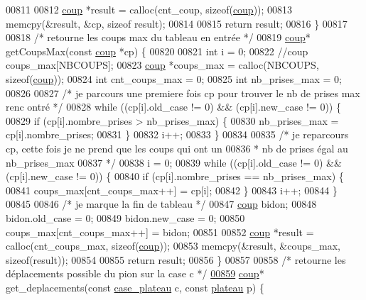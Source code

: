 \begin{DoxyCode}
00811 
00812         \hyperlink{structcoup}{coup} *result = calloc(cnt\_coup, \textcolor{keyword}{sizeof}(\hyperlink{structcoup}{coup}));
00813         memcpy(&result, &cp, \textcolor{keyword}{sizeof} result);
00814 
00815         \textcolor{keywordflow}{return} result;
00816 \}
00817 
00818 \textcolor{comment}{/* retourne les coups max du tableau en entrée */}
00819 \hyperlink{structcoup}{coup}* getCoupsMax(\textcolor{keyword}{const} \hyperlink{structcoup}{coup} *cp) \{
00820 
00821         \textcolor{keywordtype}{int} i = 0;
00822         \textcolor{comment}{//coup coups\_max[NBCOUPS];}
00823         \hyperlink{structcoup}{coup} *coups\_max = calloc(NBCOUPS, \textcolor{keyword}{sizeof}(\hyperlink{structcoup}{coup}));
00824         \textcolor{keywordtype}{int} cnt\_coups\_max = 0;
00825         \textcolor{keywordtype}{int} nb\_prises\_max = 0;
00826 
00827         \textcolor{comment}{/* je parcours une premiere fois cp pour trouver le nb de prises max renc
      ontré */}
00828         \textcolor{keywordflow}{while} ((cp[i].old\_case != 0) && (cp[i].new\_case != 0)) \{
00829                 \textcolor{keywordflow}{if} (cp[i].nombre\_prises > nb\_prises\_max) \{
00830                         nb\_prises\_max = cp[i].nombre\_prises;
00831                 \}
00832                 i++;
00833         \}
00834 
00835         \textcolor{comment}{/* je reparcours cp, cette fois je ne prend que les coups qui ont un}
00836 \textcolor{comment}{         * nb de prises égal au nb\_prises\_max}
00837 \textcolor{comment}{         */}
00838         i = 0;
00839         \textcolor{keywordflow}{while} ((cp[i].old\_case != 0) && (cp[i].new\_case != 0)) \{
00840                 \textcolor{keywordflow}{if} (cp[i].nombre\_prises == nb\_prises\_max) \{
00841                         coups\_max[cnt\_coups\_max++] = cp[i];
00842                 \}
00843                 i++;
00844         \}
00845 
00846         \textcolor{comment}{/* je marque la fin de tableau */}
00847         \hyperlink{structcoup}{coup} bidon;
00848         bidon.old\_case = 0;
00849         bidon.new\_case = 0;
00850         coups\_max[cnt\_coups\_max++] = bidon;
00851 
00852         \hyperlink{structcoup}{coup} *result = calloc(cnt\_coups\_max, \textcolor{keyword}{sizeof}(\hyperlink{structcoup}{coup}));
00853         memcpy(&result, &coups\_max, \textcolor{keyword}{sizeof}(result));
00854 
00855         \textcolor{keywordflow}{return} result;
00856 \}
00857 
00858 \textcolor{comment}{/* retourne les déplacements possible du pion sur la case c */}
\hypertarget{regles_8c_source_l00859}{}\hyperlink{regles_8h_a8cad1d75ddb058fd96ae940dd593080e}{00859} \hyperlink{structcoup}{coup}* get\_deplacements(\textcolor{keyword}{const} \hyperlink{structcase__plateau}{case_plateau} c, \textcolor{keyword}{const} \hyperlink{structplateau}{plateau} p) \{

\end{DoxyCode}
